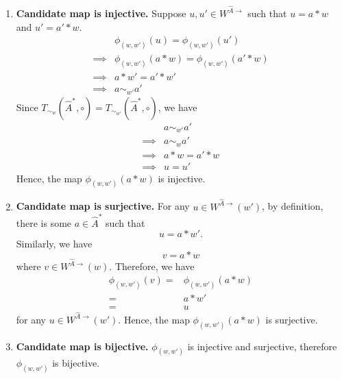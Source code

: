 \begin{proofE}
\begin{enumerate}[(1)]
\begin{enumerate}
        \item \textbf{Candidate map is injective.}
        Suppose $u, u' \in W^{\hat{A}\to}$ such that $u = a \ast w$ and $u' = a' \ast w$.
        \begin{align}
            & \phi_{(w, w')}(u) = \phi_{(w, w')}(u') \\
            \implies & \phi_{(w, w')}(a \ast w) = \phi_{(w, w')}(a' \ast w) \\
            \implies & a \ast w' = a' \ast w' \\
            \implies & a \sim_{w'} a'
        \end{align}
        Since $T_{\sim_{w}}(\hat{A}^{*}, \circ) = T_{\sim_{w'}}(\hat{A}^{*}, \circ)$, we have
        \begin{align}
            & a \sim_{w'} a' \\
            \implies & a \sim_{w} a' \\
            \implies & a \ast w = a' \ast w \\
            \implies & u = u'
        \end{align}
        Hence, the map $\phi_{(w, w')}(a \ast w)$ is injective.

        \item \textbf{Candidate map is surjective.}
        For any $u \in W^{\hat{A}\to}(w')$, by definition, there is some $a \in \hat{A}^{*}$ such that
        \begin{equation}
            u = a \ast w'.
        \end{equation}
        Similarly, we have
        \begin{equation}
            v = a \ast w
        \end{equation}
        where $v \in W^{\hat{A}\to}(w)$.
        Therefore, we have
        \begin{align}
            \phi_{(w, w')}(v) = & \phi_{(w, w')}(a \ast w) \\
            = & a \ast w' \\
            = & u
        \end{align}
        for any $u \in W^{\hat{A}\to}(w')$.
        Hence, the map $\phi_{(w, w')}(a \ast w)$ is surjective.

        \item \textbf{Candidate map is bijective.}
        $\phi_{(w, w')}$ is injective and surjective, therefore $\phi_{(w, w')}$ is bijective.


\end{enumerate}
\end{enumerate}
\end{proofE}

